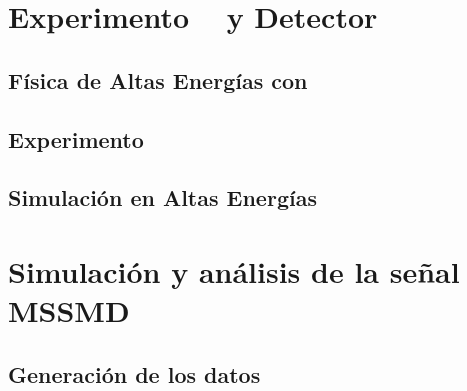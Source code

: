 \documentclass[12pt]{report}
\begin{document}

\chapter{Experimento \LHC ~ y Detector \CMS}

		
	\section{Física de Altas Energías con \LHC}
	
	
	\section{Experimento \CMS}\label{Experimento_CMS}
	

		
	\section{Simulación en Altas Energías}
	
	






\chapter{Simulación y análisis de la señal MSSMD}


    
    \section{Generación de los datos}\label{Cap_genera}
    
        
\end{document}

